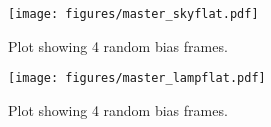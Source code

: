 \documentclass{aastex631}
\begin{document}
\begin{figure}[ht!]
    \begin{centering}
        \texttt{[image: figures/master\_skyflat.pdf]}
        \caption{
            Plot showing 4 random bias frames.
        }
        \label{fig:master_dark}
    \end{centering}
\end{figure}

\begin{figure}[ht!]
    \begin{centering}
        \texttt{[image: figures/master\_lampflat.pdf]}
        \caption{
            Plot showing 4 random bias frames.
        }
        \label{fig:master_dark}
    \end{centering}
\end{figure}


\end{document}
